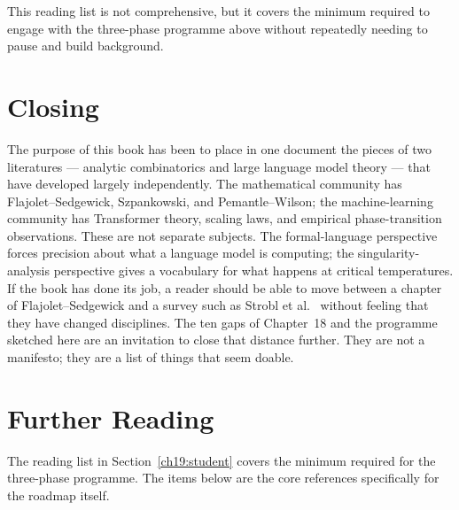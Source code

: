 This reading list is not comprehensive, but it covers the minimum
required to engage with the three-phase programme above without
repeatedly needing to pause and build background.

\section{Closing}
\label{ch19:closing}

The purpose of this book has been to place in one document the pieces
of two literatures --- analytic combinatorics and large language model
theory --- that have developed largely independently.  The mathematical
community has Flajolet--Sedgewick, Szpankowski, and Pemantle--Wilson;
the machine-learning community has Transformer theory, scaling laws,
and empirical phase-transition observations.  These are not separate
subjects.  The formal-language perspective forces precision about what
a language model is computing; the singularity-analysis perspective
gives a vocabulary for what happens at critical temperatures.  If the
book has done its job, a reader should be able to move between a
chapter of Flajolet--Sedgewick and a survey such as Strobl et
al.~\cite{StroblEtAl2024} without feeling that they have changed
disciplines.  The ten gaps of Chapter~18 and the programme sketched
here are an invitation to close that distance further.  They are not
a manifesto; they are a list of things that seem doable.

\section*{Further Reading}
\label{ch19:furtherreading}

The reading list in Section~\ref{ch19:student} covers the minimum
required for the three-phase programme.  The items below are the core
references specifically for the roadmap itself.

